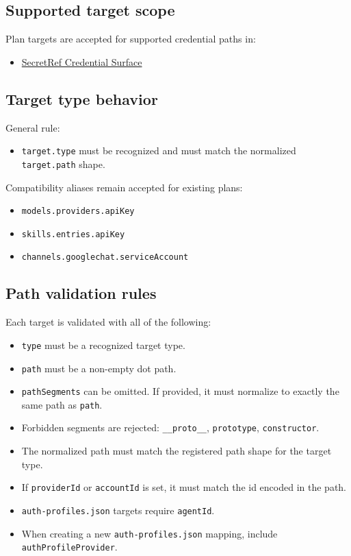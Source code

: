 \subsection{Supported target scope}


Plan targets are accepted for supported credential paths in:

\begin{itemize}
  \item \href{/reference/secretref-credential-surface}{SecretRef Credential Surface}
\end{itemize}


\subsection{Target type behavior}


General rule:

\begin{itemize}
  \item \texttt{target.type} must be recognized and must match the normalized \texttt{target.path} shape.
\end{itemize}


Compatibility aliases remain accepted for existing plans:

\begin{itemize}
  \item \texttt{models.providers.apiKey}
  \item \texttt{skills.entries.apiKey}
  \item \texttt{channels.googlechat.serviceAccount}
\end{itemize}


\subsection{Path validation rules}


Each target is validated with all of the following:

\begin{itemize}
  \item \texttt{type} must be a recognized target type.
  \item \texttt{path} must be a non-empty dot path.
  \item \texttt{pathSegments} can be omitted. If provided, it must normalize to exactly the same path as \texttt{path}.
  \item Forbidden segments are rejected: \texttt{\_\_proto\_\_}, \texttt{prototype}, \texttt{constructor}.
  \item The normalized path must match the registered path shape for the target type.
  \item If \texttt{providerId} or \texttt{accountId} is set, it must match the id encoded in the path.
  \item \texttt{auth-profiles.json} targets require \texttt{agentId}.
  \item When creating a new \texttt{auth-profiles.json} mapping, include \texttt{authProfileProvider}.
\end{itemize}


